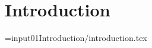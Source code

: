 \documentclass[]{report}
\begin{document}
\chapter{Introduction}
= input{01Introduction/introduction.tex}
\end{document}
